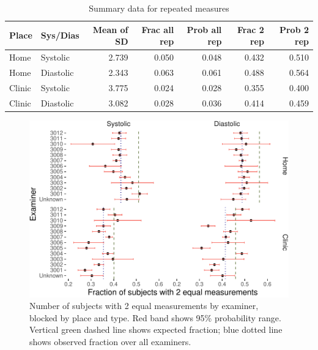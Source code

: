 \documentclass[
]{article}
\begin{document}
\begin{table}[!h]

\caption{\label{tab:sd-summary}Summary data for repeated measures}
\centering
\begin{tabular}[t]{llrrrrr}
\toprule
Place & Sys/Dias & Mean of SD & Frac all rep & Prob all rep & Frac 2 rep & Prob 2 rep\\
\midrule
Home & Systolic & 2.739 & 0.050 & 0.048 & 0.432 & 0.510\\
Home & Diastolic & 2.343 & 0.063 & 0.061 & 0.488 & 0.564\\
Clinic & Systolic & 3.775 & 0.024 & 0.028 & 0.355 & 0.400\\
Clinic & Diastolic & 3.082 & 0.028 & 0.036 & 0.414 & 0.459\\
\bottomrule
\end{tabular}
\end{table}

\begin{figure}
\centering
\includegraphics{fig_test_files/figure-latex/examinerPlot-1.pdf}
\caption{\label{fig:examinerPlot}Number of subjects with 2 equal measurements by examiner, blocked by place and type. Red band shows 95\% probability range. Vertical green dashed line shows expected fraction; blue dotted line shows observed fraction over all examiners.}
\end{figure}
\end{document}
